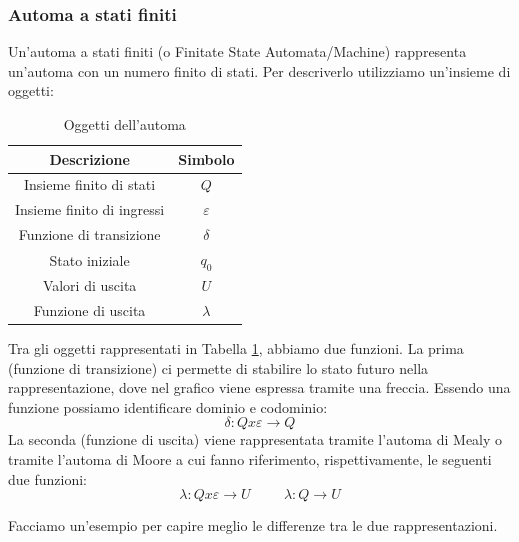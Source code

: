 \subsubsection*{Automa a stati finiti}\label{sec:automa_asf}
Un'automa a stati finiti (o Finitate State Automata/Machine) rappresenta un'automa con un numero finito di stati.
Per descriverlo utilizziamo un'insieme di oggetti:

\begin{table}[ht]
    \centering
    \begin{tabular}{|cc|}
         \hline Descrizione & Simbolo\\\hline
         Insieme finito di stati & $Q$\\
         Insieme finito di ingressi & $\varepsilon$\\
         Funzione di transizione & $\delta$\\
         Stato iniziale & $q_0$\\
         Valori di uscita & $U$\\
         Funzione di uscita & $\lambda$\\\hline
    \end{tabular}
    \caption{Oggetti dell'automa}
    \label{tab:autom_ogg}
\end{table}

Tra gli oggetti rappresentati in Tabella \ref{tab:autom_ogg}, abbiamo due funzioni. La prima (funzione di transizione) ci permette di stabilire lo stato futuro nella rappresentazione, dove nel grafico viene espressa tramite una freccia. Essendo una funzione possiamo identificare dominio e codominio:
\begin{equation*}
    \delta:Qx\varepsilon\rightarrow Q
\end{equation*}
La seconda (funzione di uscita) viene rappresentata tramite l'automa di Mealy o tramite l'automa di Moore a cui fanno riferimento, rispettivamente, le seguenti due funzioni:
\begin{equation*}
    \lambda:Qx\varepsilon\rightarrow U\hspace{1cm}\lambda:Q\rightarrow U
\end{equation*}

Facciamo un'esempio per capire meglio le differenze tra le due rappresentazioni.

